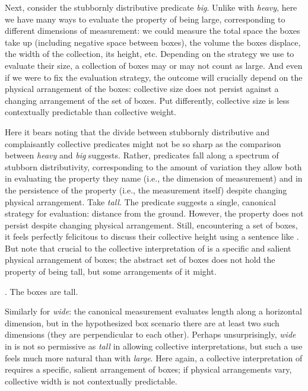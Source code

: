 \documentclass[linguex]{sp}
\begin{document}
Next, consider the stubbornly distributive predicate \emph{big}. Unlike with \emph{heavy}, here we have many ways to evaluate the property of being large, corresponding to different dimensions of measurement: we could measure the total space the boxes take up (including negative space between boxes), the volume the boxes displace, the width of the collection, its height, etc. Depending on the strategy we use to evaluate their size, a collection of boxes may or may not count as large. And even if we were to fix the evaluation strategy, the outcome will crucially depend on the physical arrangement of the boxes: collective size does not persist against a changing arrangement of the set of boxes. Put differently, collective size is less contextually predictable than collective weight.

Here it bears noting that the divide between stubbornly distributive and complaisantly collective predicates might not be so sharp as the comparison between \emph{heavy} and \emph{big} suggests. Rather, predicates fall along a spectrum of stubborn distributivity, corresponding to the amount of variation they allow both in evaluating the property they name (i.e., the dimension of measurement) and in the persistence of the property (i.e., the measurement itself) despite changing physical arrangement. Take \emph{tall}. The predicate suggests a single, canonical strategy for evaluation: distance from the ground. However, the property does not persist despite changing physical arrangement. Still, encountering a set of boxes, it feels perfectly felicitous to discuss their collective height using a sentence like \Next. But note that crucial to the collective interpretation of \Next is a specific  and salient physical arrangement of boxes; the abstract set of boxes does not hold the property of being tall, but some arrangements of it might.

\ex. The boxes are tall.

Similarly for \emph{wide}: the canonical measurement evaluates length along a horizontal dimension, but in the hypothesized box scenario there are at least two such dimensions (they are perpendicular to each other). Perhaps unsurprisingly, \emph{wide} in \Next is not so permissive as \emph{tall} in allowing collective interpretations, but such a use feels much more natural than with \emph{large}. Here again, a collective interpretation of \Next requires a specific, salient arrangement of boxes; if physical arrangements vary, collective width is not contextually predictable.
\end{document}
